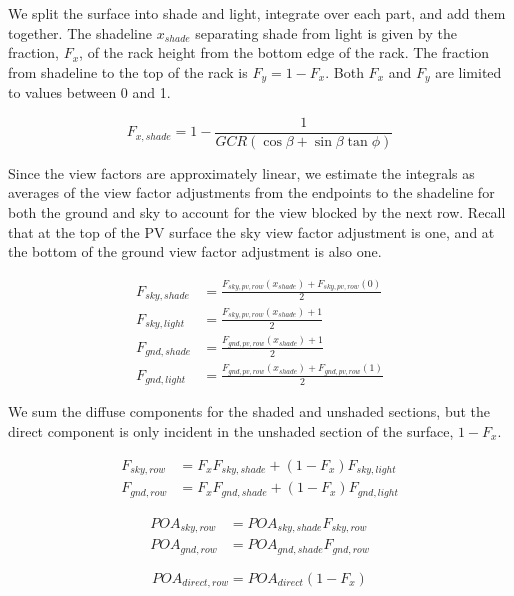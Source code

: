 \documentclass[conference]{IEEEtran}
\begin{document}
We split the surface into shade and light, integrate over each part, and add them together.  The shadeline $x_{shade}$ separating shade from light is given by the fraction, $F_x$, of the rack height from the bottom edge of the rack.  The fraction from shadeline to the top of the rack is $F_y = 1 - F_x$. Both $F_x$ and $F_y$ are limited to values between 0 and 1.

\begin{equation}
F_{x,shade} = 1 - \frac{1}{GCR\left(\cos \beta + \sin\beta \tan\phi \right)}
\end{equation}

Since the view factors are approximately linear, we estimate the integrals as averages of the view factor adjustments from the endpoints to the shadeline for both the ground and sky to account for the view blocked by the next row.  Recall that at the top of the PV surface the sky view factor adjustment is one, and at the bottom of the ground view factor adjustment is also one.

\begin{align}
F_{sky,shade} &= \frac{F_{sky,pv,row}\left(x_{shade} \right)+F_{sky,pv,row}\left(0 \right)}{2}\\
F_{sky,light} &= \frac{F_{sky,pv,row}\left(x_{shade} \right)+1}{2}\\
F_{gnd,shade} &= \frac{F_{gnd,pv,row}\left(x_{shade} \right)+1}{2}\\
F_{gnd,light} &= \frac{F_{gnd,pv,row}\left(x_{shade} \right)+F_{gnd,pv,row}\left(1 \right)}{2}
\end{align}

We sum the diffuse components for the shaded and unshaded sections, but the direct component is only incident in the unshaded section of the surface, $1-F_x$.

\begin{align}
F_{sky,row} &= F_xF_{sky,shade}+\left(1-F_x\right)F_{sky,light}\\
F_{gnd,row} &= F_xF_{gnd,shade}+\left(1-F_x\right)F_{gnd,light}
\end{align}

\begin{align}
POA_{sky,row} &= POA_{sky,shade}F_{sky,row}\\
POA_{gnd,row} &= POA_{gnd,shade}F_{gnd,row}
\end{align}

\begin{equation}
POA_{direct,row} = POA_{direct}\left(1-F_x\right)
\end{equation}
\end{document}
